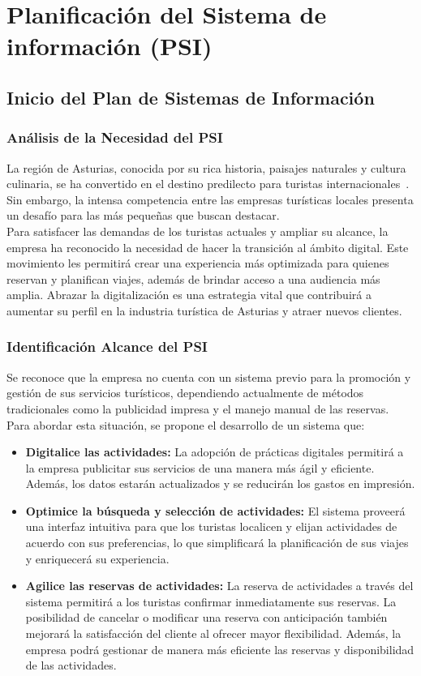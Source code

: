 \chapter{Planificación del Sistema de información (PSI)}
\section{Inicio del Plan de Sistemas de Información}
\subsection{Análisis de la Necesidad del PSI}
La región de Asturias, conocida por su rica historia, paisajes naturales y cultura culinaria, se ha convertido en el destino predilecto para turistas internacionales~\cite{turismo}. Sin embargo, la intensa competencia entre las empresas turísticas locales presenta un desafío para las más pequeñas que buscan destacar.\\[1ex]Para satisfacer las demandas de los turistas actuales y ampliar su alcance, la empresa ha reconocido la necesidad de hacer la transición al ámbito digital. Este movimiento les permitirá crear una experiencia más optimizada para quienes reservan y planifican viajes, además de brindar acceso a una audiencia más amplia. Abrazar la digitalización es una estrategia vital que contribuirá a aumentar su perfil en la industria turística de Asturias y atraer nuevos clientes.
\subsection{Identificación Alcance del PSI}
Se reconoce que la empresa no cuenta con un sistema previo para la promoción y gestión de sus servicios turísticos, dependiendo actualmente de métodos tradicionales como la publicidad impresa y el manejo manual de las reservas. Para abordar esta situación, se propone el desarrollo de un sistema que:
\begin{itemize}
	\item {\bfseries Digitalice las actividades:} La adopción de prácticas digitales permitirá a la empresa publicitar sus servicios de una manera más ágil y eficiente. Además, los datos estarán actualizados y se reducirán los gastos en impresión.
	\item {\bfseries Optimice la búsqueda y selección de actividades:} El sistema proveerá una interfaz intuitiva para que los turistas localicen y elijan actividades de acuerdo con sus preferencias, lo que simplificará la planificación de sus viajes y enriquecerá su experiencia.
	\item {\bfseries Agilice las reservas de actividades:} La reserva de actividades a través del sistema permitirá a los turistas confirmar inmediatamente sus reservas. La posibilidad de cancelar o modificar una reserva con anticipación también mejorará la satisfacción del cliente al ofrecer mayor flexibilidad.
	      Además, la empresa podrá gestionar de manera más eficiente las reservas y disponibilidad de las actividades.
\end{itemize}

